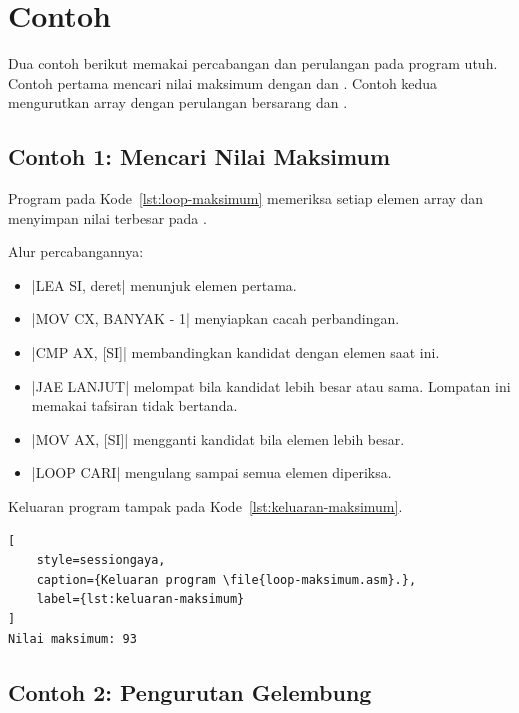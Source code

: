 \section{Contoh}
\label{sec:contoh-bab13}

Dua contoh berikut memakai percabangan dan perulangan pada program
utuh. Contoh pertama mencari nilai maksimum dengan  dan
. Contoh kedua mengurutkan array dengan perulangan
bersarang dan .

\subsection{Contoh 1: Mencari Nilai Maksimum}

Program pada Kode~\ref{lst:loop-maksimum} memeriksa setiap elemen
array dan menyimpan nilai terbesar pada .



Alur percabangannya:

\begin{itemize}
    \item \lstasm|LEA SI, deret| menunjuk elemen pertama.
    \item \lstasm|MOV CX, BANYAK - 1| menyiapkan cacah perbandingan.
    \item \lstasm|CMP AX, [SI]| membandingkan kandidat dengan elemen
          saat ini.
    \item \lstasm|JAE LANJUT| melompat bila kandidat lebih besar atau
          sama. Lompatan ini memakai tafsiran tidak bertanda.
    \item \lstasm|MOV AX, [SI]| mengganti kandidat bila elemen lebih
          besar.
    \item \lstasm|LOOP CARI| mengulang sampai semua elemen diperiksa.
\end{itemize}

Keluaran program tampak pada Kode~\ref{lst:keluaran-maksimum}.

\begin{lstlisting}[
    style=sessiongaya,
    caption={Keluaran program \file{loop-maksimum.asm}.},
    label={lst:keluaran-maksimum}
]
Nilai maksimum: 93
\end{lstlisting}

\subsection{Contoh 2: Pengurutan Gelembung}

